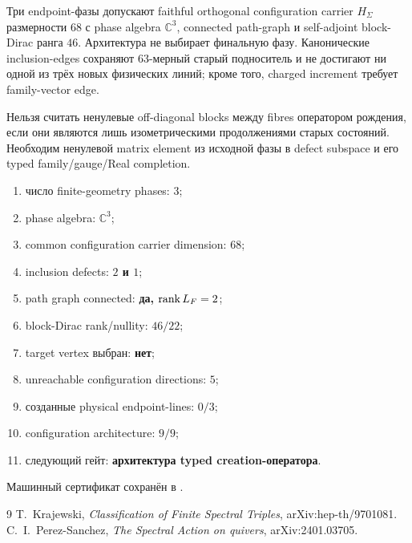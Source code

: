 \begin{theorem}
Три endpoint-фазы допускают faithful orthogonal configuration carrier
$H_\Sigma$ размерности $68$ с phase algebra $\mathbb C^3$, connected
path-graph и self-adjoint block-Dirac ранга $46$. Архитектура не выбирает
финальную фазу. Канонические inclusion-edges сохраняют 63-мерный старый
подноситель и не достигают ни одной из трёх новых физических линий; кроме
того, charged increment требует family-vector edge.
\end{theorem}

\begin{nogocriterion}
Нельзя считать ненулевые off-diagonal blocks между fibres оператором
рождения, если они являются лишь изометрическими продолжениями старых
состояний. Необходим ненулевой matrix element из исходной фазы в defect
subspace и его typed family/gauge/Real completion.
\end{nogocriterion}

\begin{protocol}\begin{enumerate}
\item число finite-geometry phases: \textbf{$3$};
\item phase algebra: \textbf{$\mathbb C^3$};
\item common configuration carrier dimension: \textbf{$68$};
\item inclusion defects: \textbf{$2$ и $1$};
\item path graph connected: \textbf{да, $\operatorname{rank} L_F=2$};
\item block-Dirac rank/nullity: \textbf{$46/22$};
\item target vertex выбран: \textbf{нет};
\item unreachable configuration directions: \textbf{$5$};
\item созданные physical endpoint-lines: \textbf{$0/3$};
\item configuration architecture: \textbf{$9/9$};
\item следующий гейт: \textbf{архитектура typed creation-оператора}.
\end{enumerate}\end{protocol}

Машинный сертификат сохранён в
.

\begin{thebibliography}{9}
T.~Krajewski, \emph{Classification of Finite Spectral Triples},
arXiv:hep-th/9701081.
C.~I.~Perez-Sanchez, \emph{The Spectral Action on quivers},
arXiv:2401.03705.
\end{thebibliography}